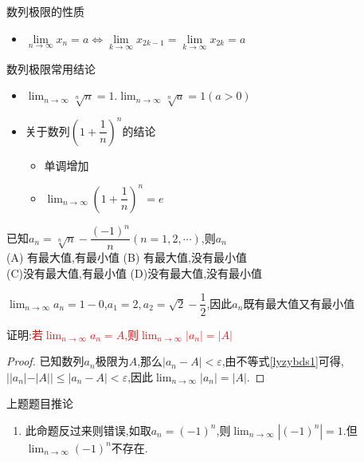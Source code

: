 \documentclass[8pt a4paper, oneside, UTF8]{ctexbook}
\begin{document}
\begin{sloppypar}
\begin{criterion}{数列极限的性质}{}
\begin{itemize}
            \item $\underset{n\to\infty}{\operatorname*{\lim}}x_n=a\Leftrightarrow\underset{k\to\infty}{\operatorname*{\lim}}x_{2k-1}=\underset{k\to\infty}{\operatorname*{\lim}}x_{2k}=a$
        \end{itemize}
    \end{criterion}
    \begin{conclusion}{数列极限常用结论}{}
        \begin{itemize}
            \item \textbf{$\lim_{n \to \infty }\sqrt[n]{n}=1.\lim_{n \to \infty} \sqrt[n]{a}=1(a>0)$}\label{jl1}
            \item 关于数列$(1+\dfrac{1}{n})^n$的结论
                  \begin{itemize}
                      \item 单调增加
                      \item $\lim_{n\to \infty}(1+\dfrac{1}{n})^n=e$
                  \end{itemize}
        \end{itemize}
    \end{conclusion}
    \begin{problem}
    已知$a_{n}=\sqrt[n]{n}-\dfrac{(-1)^{n}}{n}(n=1,2,\cdots)$,则${a_n}$\\
    (A) 有最大值,有最小值 \quad (B) 有最大值,没有最小值 \\ (C)没有最大值,有最小值 \quad (D)没有最大值,没有最小值
    \end{problem}
    \begin{solution}
        $\lim_{n\to \infty}a_n=1-0$,$a_1=2,a_2=\sqrt{2}-\dfrac{1}{2}$,因此$a_n$既有最大值又有最小值
    \end{solution}
    \begin{problem}
    证明:\textcolor{red}{若$\lim_{n \to \infty}a_n=A$,则$\lim_{n \to \infty}|a_n|=|A|$}
    \end{problem}
    \begin{proof}
        已知数列$a_n$极限为$A$,那么$|a_n-A|<\varepsilon$,由不等式\ref{lyzybds1}可得,$||a_n|-|A||\leqslant|a_n -A|<\varepsilon$,因此$\lim_{n \to \infty }|a_n|=|A|$.
    \end{proof}
    \begin{corollary}{上题题目推论}{}
        \begin{enumerate}
            \item 此命题反过来则错误,如取$a_n=(-1)^n$,则$\lim_{n\to\infty}\left|(-1)^n\right|=1$.但$\lim_{n\to\infty}(-1)^n$不存在.

\end{enumerate}
\end{corollary}
\end{sloppypar}
\end{document}
